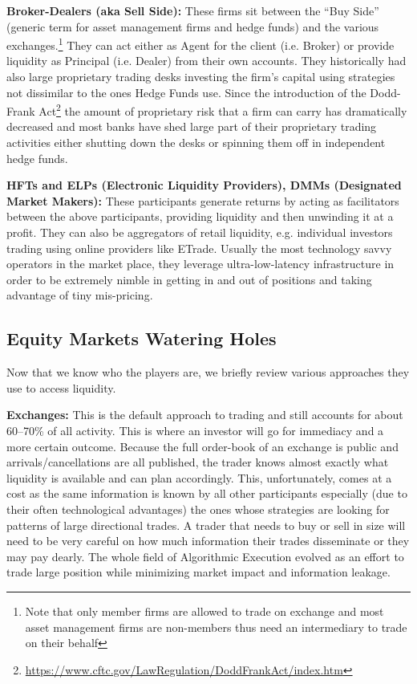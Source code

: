 \noindent\textbf{Broker-Dealers (aka Sell Side):} These firms sit between the ``Buy Side'' (generic term for asset management firms and hedge funds) and the various exchanges.\footnote{Note that only member firms are allowed to trade on exchange and most asset management firms are non-members thus need an intermediary to trade on their behalf} They can act either as Agent for the client (i.e. Broker) or provide liquidity as Principal (i.e. Dealer) from their own accounts. They historically had  also large proprietary trading desks investing the firm's capital using strategies not dissimilar to the ones Hedge Funds use. Since the introduction of the Dodd-Frank Act\footnote{\url{https://www.cftc.gov/LawRegulation/DoddFrankAct/index.htm}} the amount of proprietary risk that a firm can carry has dramatically decreased and most banks have shed large part of their proprietary trading activities either shutting down the desks or spinning them off in independent hedge funds. \twomedskip

\noindent\textbf{HFTs and ELPs (Electronic Liquidity Providers), DMMs (Designated Market Makers):} These participants generate returns by acting as facilitators between the above participants, providing liquidity and then unwinding it at a profit. They can also be aggregators of retail liquidity, e.g. individual investors trading using online providers like ETrade. Usually the most technology savvy operators in the market place, they leverage ultra-low-latency infrastructure in order to be extremely nimble in getting in and out of positions and taking advantage of tiny mis-pricing. 


\subsection{Equity Markets Watering Holes}

Now that we know who the players are, we briefly review various approaches they use to access liquidity. \twomedskip

\noindent\textbf{Exchanges:} This is the default approach to trading and still accounts for about 60--70\% of all activity. This is where an investor will go for immediacy and a more certain outcome. Because the full order-book of an exchange is public and arrivals/cancellations are all published, the trader knows almost exactly what liquidity is available and can plan accordingly. This, unfortunately, comes at a cost as the same information is known by all other participants especially (due to their often technological advantages) the ones whose strategies are looking for patterns of large directional trades. A trader that needs to buy or sell in size will need to be very careful on how much information their trades disseminate or they may pay dearly. The whole field of Algorithmic Execution evolved as an effort to trade large position while minimizing market impact and information leakage.

